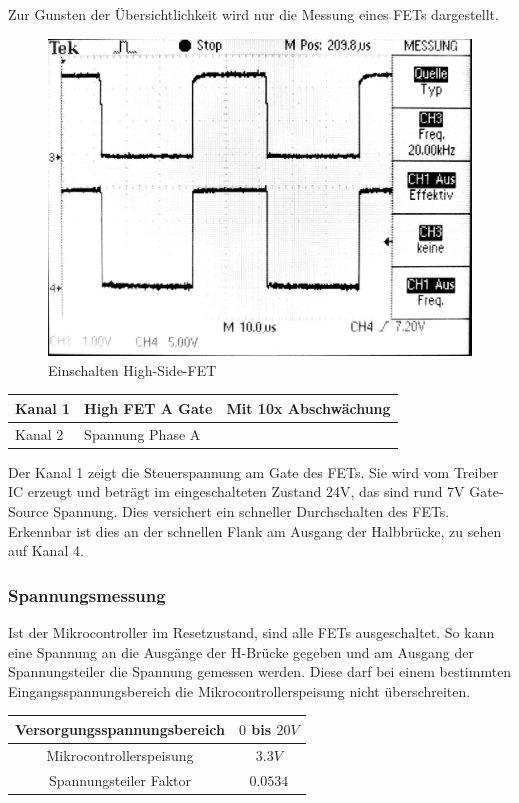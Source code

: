 Zur Gunsten der Übersichtlichkeit wird nur die Messung eines FETs dargestellt.

\begin{figure} [H]
	\centering
	\includegraphics[width=0.5\linewidth]{images/valmcfet.jpg}
	\caption{Einschalten High-Side-FET}
	\label{fig:hsfet}
\end{figure}
\begin{center}
	\begin{tabular}{|l|l|l|}
		\hline 
		Kanal 1 & High FET A Gate & Mit 10x Abschwächung\\ \hline
		Kanal 2 & Spannung Phase A & {}\\ \hline
	\end{tabular}
\end{center}

Der Kanal 1 zeigt die Steuerspannung am Gate des FETs. Sie wird vom Treiber IC erzeugt und beträgt im eingeschalteten Zustand 24V, das sind rund 7V Gate-Source Spannung. Dies versichert ein schneller Durchschalten des FETs. Erkennbar ist dies an der schnellen Flank am Ausgang der Halbbrücke, zu sehen auf Kanal 4.

\subsubsection*{Spannungsmessung}
Ist der Mikrocontroller im Resetzustand, sind alle FETs ausgeschaltet. So kann eine Spannung an die Ausgänge der H-Brücke gegeben und am Ausgang der Spannungsteiler die Spannung gemessen werden. Diese darf bei einem bestimmten Eingangsspannungsbereich die Mikrocontrollerspeisung nicht überschreiten.

\begin{center}
	\begin{tabular}{|c|c|}
		\hline 
		Versorgungsspannungsbereich & $0$ bis $20V$ \\ \hline
		Mikrocontrollerspeisung & $3.3V$ \\ \hline
		Spannungsteiler Faktor & $0.0534$ \\ \hline
	\end{tabular} 
	\label{tab:vmessbed}
\end{center}

